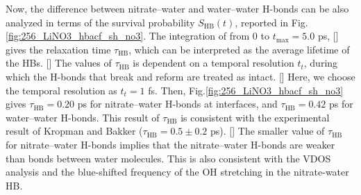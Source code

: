 Now, the difference between nitrate--water and water--water H-bonds 
can be also analyzed in terms of the survival probability $S_{\text{HB}}(t)$,
\cite{AKS86,JT90,AL96} 
reported in Fig.\space\ref {fig:256_LiNO3_hbacf_sh_no3}.
The integration of \SHB from 0 to $t_{\max}=5.0$ ps, [\cite{Steinel2004}] gives the relaxation time $\tau_\text{HB}$, which can be interpreted as 
the average lifetime of the HBs. [\cite{SC02}] 
The values of $\tau_{\text{HB}}$ is dependent on a temporal resolution $t_t$, during which the H-bonds that break and reform are treated as intact. [\cite{AL00}] Here, 
we choose the temporal resolution as $t_t=1$ fs. 
Then, Fig.\space\ref {fig:256_LiNO3_hbacf_sh_no3} gives $\tau_\text{HB}=0.20$ ps for nitrate--water H-bonds at interfaces, and $\tau_\text{HB}=0.42$ ps for water--water H-bonds.
This result of $\tau_\text{HB}$ is consistent with the experimental result of Kropman and Bakker ($\tau_\text{HB}=0.5\pm0.2$ ps). [\cite{MFK01}]
The smaller value of $\tau_\text{HB}$ for nitrate--water H-bonds implies that the nitrate--water H-bonds are weaker than bonds between water molecules. 
This is also consistent with the VDOS analysis and the blue-shifted frequency of the OH stretching in the nitrate-water HB.

\FloatBarrier
